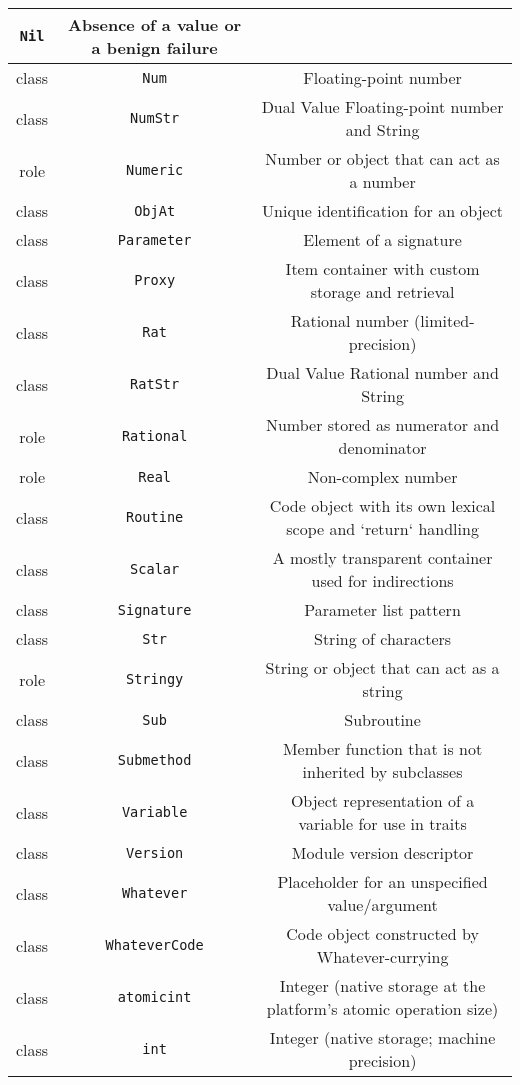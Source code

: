 \documentclass[17pt,english]{extarticle}
\providecommand{\tabularnewline}{\\}
\begin{document}
\begin{longtable}{|c|c|c|}
\texttt{\small{}Nil} &
{\small{}Absence of a value or a benign failure}\tabularnewline
\hline 
{\small{}class} &
\texttt{\small{}Num} &
{\small{}Floating-point number}\tabularnewline
\hline 
{\small{}class} &
\texttt{\small{}NumStr} &
{\small{}Dual Value Floating-point number and String}\tabularnewline
\hline 
{\small{}role} &
\texttt{\small{}Numeric} &
{\small{}Number or object that can act as a number}\tabularnewline
\hline 
{\small{}class} &
\texttt{\small{}ObjAt} &
{\small{}Unique identification for an object}\tabularnewline
\hline 
{\small{}class} &
\texttt{\small{}Parameter} &
{\small{}Element of a signature}\tabularnewline
\hline 
{\small{}class} &
\texttt{\small{}Proxy} &
{\small{}Item container with custom storage and retrieval}\tabularnewline
\hline 
{\small{}class} &
\texttt{\small{}Rat} &
{\small{}Rational number (limited-precision)}\tabularnewline
\hline 
{\small{}class} &
\texttt{\small{}RatStr} &
{\small{}Dual Value Rational number and String}\tabularnewline
\hline 
{\small{}role} &
\texttt{\small{}Rational} &
{\small{}Number stored as numerator and denominator}\tabularnewline
\hline 
{\small{}role} &
\texttt{\small{}Real} &
{\small{}Non-complex number}\tabularnewline
\hline 
{\small{}class} &
\texttt{\small{}Routine} &
{\small{}Code object with its own lexical scope and `return` handling}\tabularnewline
\hline 
{\small{}class} &
\texttt{\small{}Scalar} &
{\small{}A mostly transparent container used for indirections}\tabularnewline
\hline 
{\small{}class} &
\texttt{\small{}Signature} &
{\small{}Parameter list pattern}\tabularnewline
\hline 
{\small{}class} &
\texttt{\small{}Str} &
{\small{}String of characters}\tabularnewline
\hline 
{\small{}role} &
\texttt{\small{}Stringy} &
{\small{}String or object that can act as a string}\tabularnewline
\hline 
{\small{}class} &
\texttt{\small{}Sub} &
{\small{}Subroutine}\tabularnewline
\hline 
{\small{}class} &
\texttt{\small{}Submethod} &
{\small{}Member function that is not inherited by subclasses}\tabularnewline
\hline 
{\small{}class} &
\texttt{\small{}Variable} &
{\small{}Object representation of a variable for use in traits}\tabularnewline
\hline 
{\small{}class} &
\texttt{\small{}Version} &
{\small{}Module version descriptor}\tabularnewline
\hline 
{\small{}class} &
\texttt{\small{}Whatever} &
{\small{}Placeholder for an unspecified value/argument}\tabularnewline
\hline 
{\small{}class} &
\texttt{\small{}WhateverCode} &
{\small{}Code object constructed by Whatever-currying}\tabularnewline
\hline 
{\small{}class} &
\texttt{\small{}atomicint} &
{\small{}Integer (native storage at the platform's atomic operation
size)}\tabularnewline
\hline 
{\small{}class} &
\texttt{\small{}int} &
{\small{}Integer (native storage; machine precision)}\tabularnewline
\hline 
\end{longtable}
\end{document}
